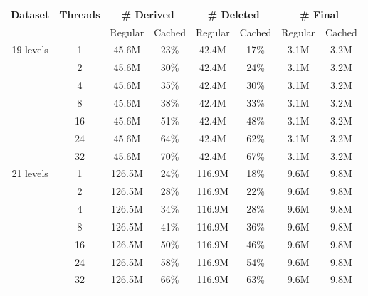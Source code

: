 \begin{tabular}{c | c || c c | c c | c c} \hline
	 \multirow{2}{*}{\textbf{Dataset}} & \multirow{2}{*}{\textbf{Threads}} & \multicolumn{2}{c|}{\textbf{\# Derived}} & \multicolumn{2}{c|}{\textbf{\# Deleted}} & \multicolumn{2}{c}{\textbf{\# Final}}\\
	 & & Regular & Cached & Regular & Cached & Regular & Cached\\ \hline \hline
\multirow{7}{*}{19 levels}  & 1 &  45.6M & 23\% & 42.4M & 17\% & 3.1M & 3.2M \\
 & 2 &  45.6M & 30\% & 42.4M & 24\% & 3.1M & 3.2M \\
 & 4 &  45.6M & 35\% & 42.4M & 30\% & 3.1M & 3.2M \\
 & 8 &  45.6M & 38\% & 42.4M & 33\% & 3.1M & 3.2M \\
 & 16 &  45.6M & 51\% & 42.4M & 48\% & 3.1M & 3.2M \\
 & 24 &  45.6M & 64\% & 42.4M & 62\% & 3.1M & 3.2M \\
 & 32 &  45.6M & 70\% & 42.4M & 67\% & 3.1M & 3.2M \\
	\hline
\multirow{7}{*}{21 levels}  & 1 &  126.5M & 24\% & 116.9M & 18\% & 9.6M & 9.8M \\
 & 2 &  126.5M & 28\% & 116.9M & 22\% & 9.6M & 9.8M \\
 & 4 &  126.5M & 34\% & 116.9M & 28\% & 9.6M & 9.8M \\
 & 8 &  126.5M & 41\% & 116.9M & 36\% & 9.6M & 9.8M \\
 & 16 &  126.5M & 50\% & 116.9M & 46\% & 9.6M & 9.8M \\
 & 24 &  126.5M & 58\% & 116.9M & 54\% & 9.6M & 9.8M \\
 & 32 &  126.5M & 66\% & 116.9M & 63\% & 9.6M & 9.8M \\
	\hline
\end{tabular}
